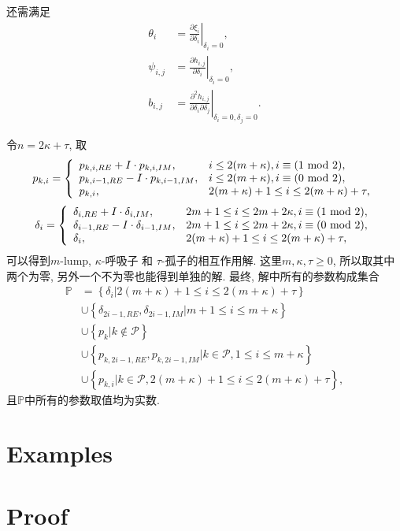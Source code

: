 \documentclass{article}
\newcommand{\bbrace}[1]{\left\{#1\right\}}
\newcommand{\eval}[2]{\left.{#1}\right|_{#2}}
\newcommand{\PS}{\mathcal{P}}
\newcommand{\DIFF}[2]{\ensuremath{\frac{\partial #1}{\partial #2}}}
\renewcommand{\mod}{{\rm ~mod~}}
\begin{document}
还需满足 
\begin{equation}
\begin{aligned} 
\theta_i &= \eval{\DIFF{\xi_i}{\delta_i}}{\delta_i=0} ,\\ 
\psi_{i,j} &= \eval{\DIFF{h_{i,j}}{\delta_i}}{\delta_i=0} ,\\ 
b_{i,j} &= \eval{\frac{\partial^2 h_{i,j}}{\partial \delta_i \partial \delta_j}}{\delta_i=0,\delta_j=0} .
\end{aligned}
\end{equation}

令$n=2\kappa+\tau$, 取
\begin{equation}
p_{k,i}=\left\{
\begin{array}{ll}
  p_{k,i,RE}+I\cdot p_{k,i,IM}, & i\le 2(m+\kappa), i\equiv(1 \mod 2),\\
  p_{k,i-1,RE}-I\cdot p_{k,i-1,IM}, & i\le 2(m+\kappa), i\equiv(0 \mod 2),\\
  p_{k,i}, & 2(m+\kappa)+1 \le i \le 2(m+\kappa)+\tau ,
\end{array}
\right.
\end{equation}
\begin{equation}
\delta_i=\left\{\begin{array}{ll}
  \delta_{i,RE}+I\cdot\delta_{i,IM}, & 2m+1\le i \le 2m+2\kappa, i\equiv(1 \mod 2), \\ 
  \delta_{i-1,RE}-I\cdot\delta_{i-1,IM}, & 2m+1\le i \le 2m+2\kappa, i\equiv(0 \mod 2) ,\\
  \delta_i, & 2(m+\kappa)+1 \le i \le 2(m+\kappa)+\tau ,
\end{array}\right.
\end{equation}
可以得到$m$-lump, $\kappa$-呼吸子 和 $\tau$-孤子的相互作用解. 这里$m,\kappa,\tau\ge 0$, 所以取其中两个为零, 另外一个不为零也能得到单独的解. 最终, 解中所有的参数构成集合
\begin{equation}
\begin{aligned}
\mathbb{P}
&=\bbrace{\delta_i|2(m+\kappa)+1 \le i \le 2(m+\kappa)+\tau}  \\
&\cup\bbrace{\delta_{2i-1,RE},\delta_{2i-1,IM}|m+1\le i \le m+\kappa} \\ 
&\cup\bbrace{p_k|k\not\in \PS} \\
&\cup\bbrace{p_{k,2i-1,RE},p_{k,2i-1,IM}|k\in\PS,1\le i \le m+\kappa} \\
&\cup\bbrace{p_{k,i}|k\in\PS,2(m+\kappa)+1 \le i \le 2(m+\kappa)+\tau},
\end{aligned}
\end{equation}
且$\mathbb P$中所有的参数取值均为实数. 

\section{Examples}

\section{Proof}
\end{document}
